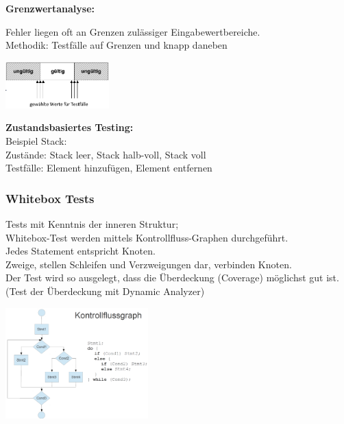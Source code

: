 \textbf{Grenzwertanalyse:} \\
\begin{minipage}{12cm}
Fehler liegen oft an Grenzen zulässiger Eingabewertbereiche. \\
Methodik: Testfälle auf Grenzen und knapp daneben \\
\end{minipage}
\begin{minipage}{4cm}
	\includegraphics[width=4cm]{images/grenzwertanalyse.png}
\end{minipage}

\textbf{Zustandsbasiertes Testing:} \\
Beispiel Stack: \\
Zustände: Stack leer, Stack halb-voll, Stack voll \\
Testfälle: Element hinzufügen, Element entfernen

\subsubsection{Whitebox Tests}
\begin{minipage}{13cm}
Tests mit Kenntnis der inneren Struktur;\\
Whitebox-Test werden mittels Kontrollfluss-Graphen durchgeführt. \\
Jedes Statement entspricht Knoten.\\
Zweige, stellen Schleifen und Verzweigungen dar, verbinden Knoten. \\
Der Test wird so ausgelegt, dass die Überdeckung (Coverage) möglichst gut ist. (Test der Überdeckung mit Dynamic Analyzer)
\end{minipage}
\begin{minipage}{5.5cm}
	\includegraphics[width=5.5cm]{images/kontrollflussgraphen.png}
\end{minipage}

